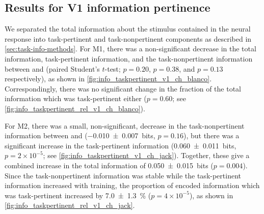 \subsection{Results for \acs{V1} information pertinence}

We separated the total information about the stimulus contained in the neural response into task-pertinent and task-nonpertinent components as described in \autoref{sec:task-info-methods}.
For \ac{M1}, there was a non-significant decrease in the total information, task-pertinent information, and the task-nonpertinent information between  and  (paired Student's $t$-test; $p=0.20$, $p=0.38$, and $p=0.13$ respectively), as shown in \autoref{fig:info_taskpertinent_v1_ch_blanco}.
Correspondingly, there was no significant change in the fraction of the total information which was task-pertinent either ($p=0.60$; see \autoref{fig:info_taskpertinent_rel_v1_ch_blanco}).

For \ac{M2}, there was a small, non-significant, decrease in the task-nonpertinent information between  and  (\SI{-0.010\pm0.007}{bits}, $p=0.16$), but there was a significant increase in the task-pertinent information (\SI{+0.060\pm0.011}{bits}, $p = 2 \times 10^{-5}$; see \autoref{fig:info_taskpertinent_v1_ch_jack}).
Together, these give a combined increase in the total information of \SI{+0.050\pm0.015}{bits} ($p=0.004$).
Since the task-nonpertinent information was stable while the task-pertinent information increased with training, the proportion of encoded information which was task-pertinent increased by \SI{+7.0\pm1.3}{\percent} ($p = 4 \times 10^{-5}$), as shown in \autoref{fig:info_taskpertinent_rel_v1_ch_jack}.

%
%
%
%

